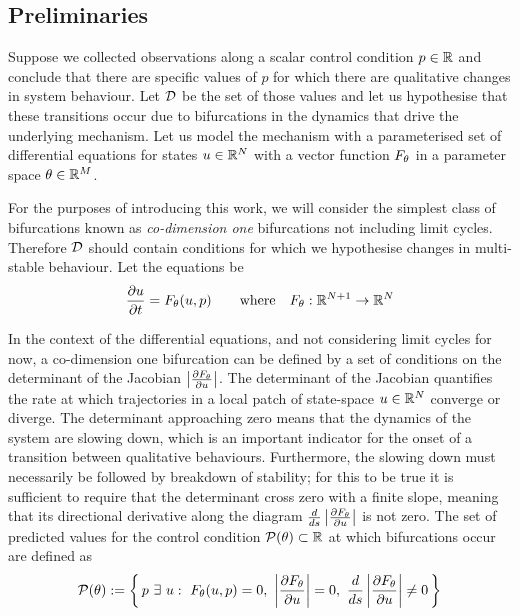 \subsection{Preliminaries}

Suppose we collected observations along a scalar control condition $p\in\mathbb{R}$ and conclude that there are specific values of $p$ for which there are qualitative changes in system behaviour. Let $\mathcal{D}$ be the set of those values and let us hypothesise that these transitions occur due to bifurcations in the dynamics that drive the underlying mechanism. Let us model the mechanism with a parameterised set of differential equations for states $u\in\mathbb{R}^N$ with a vector function $F_{\theta}$ in a parameter space $\theta\in\mathbb{R}^M$.

For the purposes of introducing this work, we will consider the simplest class of bifurcations known as \textit{co-dimension one} bifurcations not including limit cycles. Therefore $\mathcal{D}$ should contain conditions for which we hypothesise changes in multi-stable behaviour. Let the equations be
\begin{align}
	\frac{\partial u}{\partial t}=F_{\theta}(u,p)
	\qquad\mathrm{where}\quad
	F_{\theta} : \mathbb{R}^{N+1}\rightarrow\mathbb{R}^N
	\label{eq:model}
\end{align}

In the context of the differential equations, and not considering limit cycles for now, a co-dimension one bifurcation can be defined by a set of conditions on the determinant of the Jacobian $\left| \frac{\partial F_{\theta}}{\partial u} \right|$. The determinant of the Jacobian quantifies the rate at which trajectories in a local patch of state-space $u\in\mathbb{R}^N$ converge or diverge. The determinant approaching zero means that the dynamics of the system are slowing down, which is an important indicator for the onset of a transition between qualitative behaviours. Furthermore, the slowing down must necessarily be followed by breakdown of stability; for this to be true it is sufficient to require that the determinant cross zero with a finite slope, meaning that its directional derivative along the diagram $\frac{d}{ds}\left| \frac{\partial F_{\theta}}{\partial u} \right|$ is not zero. The set of predicted values for the control condition $\mathcal{P}(\theta)\subset\mathbb{R}$ at which bifurcations occur are defined as
\begin{align}
	\mathcal{P}(\theta):=\left\{\,
	p\,\,\exists\,\,u:\,\,F_{\theta}(u,p)=0,\,\,\left| \frac{\partial F_{\theta}}{\partial u} \right|=0,
	\,\, \frac{d}{ds}\left| \frac{\partial F_{\theta}}{\partial u} \right|\neq0
	\,\right\}
	\label{eq:predictions}
\end{align}

